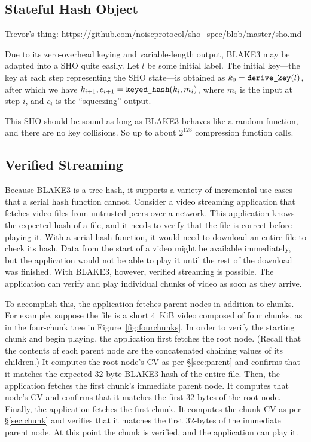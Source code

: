 \documentclass[11pt,notitlepage,a4paper]{article}
\begin{document}
\subsection{Stateful Hash Object}\label{sec:sho}

Trevor's thing: \url{https://github.com/noiseprotocol/sho_spec/blob/master/sho.md}

Due to its zero-overhead keying and variable-length output, BLAKE3 may be adapted into a SHO quite easily. Let $l$ be some initial label. The initial key---the key at each step representing the SHO state---is obtained as $k_0 =\text{\texttt{derive\_key}}(l)$, after which we have $k_{i+1}, c_{i+1} = \text{\texttt{keyed\_hash}}(k_i, m_i)$, where $m_i$ is the input at step $i$, and $c_i$ is the ``squeezing'' output.

This SHO should be sound as long as BLAKE3 behaves like a random function, and there are no key collisions. So up to about $2^{128}$ compression function calls.

\subsection{Verified Streaming}\label{sec:verifiedstreaming}

Because BLAKE3 is a tree hash, it supports a variety of incremental use cases
that a serial hash function cannot. Consider a video streaming application that
fetches video files from untrusted peers over a network. This application knows
the expected hash of a file, and it needs to verify that the file is correct
before playing it. With a serial hash function, it would need to download an
entire file to check its hash. Data from the start of a video might be
available immediately, but the application would not be able to play it until
the rest of the download was finished. With BLAKE3, however, verified streaming
is possible. The application can verify and play individual chunks of video as
soon as they arrive.

To accomplish this, the application fetches parent nodes in addition to chunks.
For example, suppose the file is a short 4~KiB video composed of four chunks,
as in the four-chunk tree in Figure~\ref{fig:fourchunks}. In order to verify
the starting chunk and begin playing, the application first fetches the root
node. (Recall that the contents of each parent node are the concatenated
chaining values of its children.) It computes the root node's CV as per
\S\ref{sec:parent} and confirms that it matches the expected 32-byte BLAKE3
hash of the entire file. Then, the application fetches the first chunk's
immediate parent node. It computes that node's CV and confirms that it matches
the first 32-bytes of the root node. Finally, the application fetches the first
chunk. It computes the chunk CV as per \S\ref{sec:chunk} and verifies that it
matches the first 32-bytes of the immediate parent node. At this point the
chunk is verified, and the application can play it.
\end{document}
